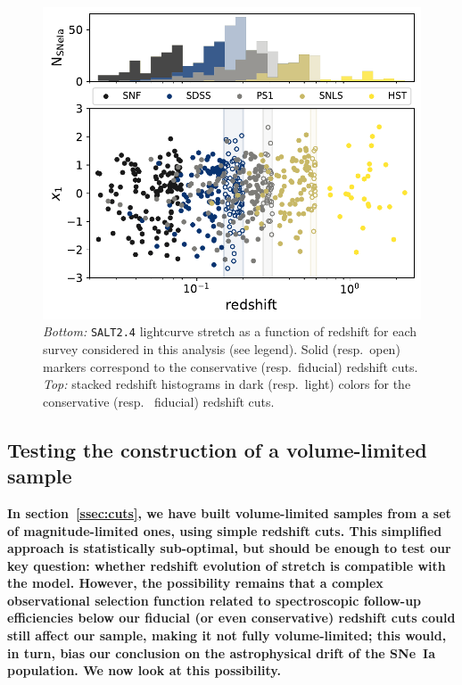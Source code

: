 \documentclass[referee]{aa}
\begin{document}
\begin{figure}
    \centering
    \includegraphics[width=0.95\linewidth]{Article_figures/stretchs-cut_btw_hist_stac_75-lb-cividis.pdf}
    \caption{\textit{Bottom:} \textsc{\texttt{SALT2.4}} lightcurve stretch as a
        function of redshift for each survey considered in this analysis (see
        legend). Solid (resp.\ open) markers correspond to the conservative
        (resp.\ fiducial) redshift cuts. \textit{Top:} stacked redshift
    histograms in dark (resp.\ light) colors for the conservative (resp. \
fiducial) redshift cuts.}
    \label{fig:sample}
\end{figure}

\subsection{Testing the construction of a volume-limited sample}\label{ssec:verify}

\textbf{In section~\ref{ssec:cuts}, we have built volume-limited samples from a
    set of magnitude-limited ones, using simple redshift cuts. This simplified
    approach is statistically sub-optimal, but should be enough to test our key
    question: whether redshift evolution of stretch is compatible with the
    \cite{rigault2020} model. However, the possibility remains that a complex
    observational selection function related to spectroscopic follow-up
    efficiencies below our fiducial (or even conservative) redshift cuts could
still affect our sample, making it not fully volume-limited; this would, in
turn, bias our conclusion on the astrophysical drift of the SNe~Ia population.
We now look at this possibility.}
\end{document}
